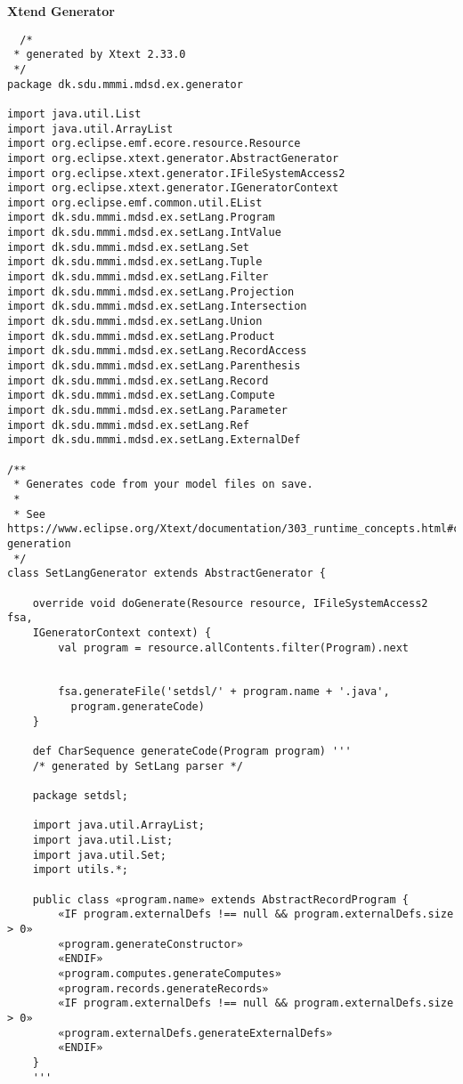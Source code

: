 \documentclass[12pt]{article}
\begin{document}
\textbf{Xtend Generator}

\begin{verbatim}
  /*
 * generated by Xtext 2.33.0
 */
package dk.sdu.mmmi.mdsd.ex.generator

import java.util.List
import java.util.ArrayList
import org.eclipse.emf.ecore.resource.Resource
import org.eclipse.xtext.generator.AbstractGenerator
import org.eclipse.xtext.generator.IFileSystemAccess2
import org.eclipse.xtext.generator.IGeneratorContext
import org.eclipse.emf.common.util.EList
import dk.sdu.mmmi.mdsd.ex.setLang.Program
import dk.sdu.mmmi.mdsd.ex.setLang.IntValue
import dk.sdu.mmmi.mdsd.ex.setLang.Set
import dk.sdu.mmmi.mdsd.ex.setLang.Tuple
import dk.sdu.mmmi.mdsd.ex.setLang.Filter
import dk.sdu.mmmi.mdsd.ex.setLang.Projection
import dk.sdu.mmmi.mdsd.ex.setLang.Intersection
import dk.sdu.mmmi.mdsd.ex.setLang.Union
import dk.sdu.mmmi.mdsd.ex.setLang.Product
import dk.sdu.mmmi.mdsd.ex.setLang.RecordAccess
import dk.sdu.mmmi.mdsd.ex.setLang.Parenthesis
import dk.sdu.mmmi.mdsd.ex.setLang.Record
import dk.sdu.mmmi.mdsd.ex.setLang.Compute
import dk.sdu.mmmi.mdsd.ex.setLang.Parameter
import dk.sdu.mmmi.mdsd.ex.setLang.Ref
import dk.sdu.mmmi.mdsd.ex.setLang.ExternalDef

/**
 * Generates code from your model files on save.
 * 
 * See https://www.eclipse.org/Xtext/documentation/303_runtime_concepts.html#code-generation
 */
class SetLangGenerator extends AbstractGenerator {

	override void doGenerate(Resource resource, IFileSystemAccess2 fsa, 
    IGeneratorContext context) {
		val program = resource.allContents.filter(Program).next
		
		
		fsa.generateFile('setdsl/' + program.name + '.java', 
          program.generateCode)
	}
	
	def CharSequence generateCode(Program program) '''
	/* generated by SetLang parser */
	
	package setdsl;
	
	import java.util.ArrayList;
	import java.util.List;
	import java.util.Set;
	import utils.*;
	
	public class «program.name» extends AbstractRecordProgram {
		«IF program.externalDefs !== null && program.externalDefs.size > 0»
		«program.generateConstructor»
		«ENDIF»
		«program.computes.generateComputes»
		«program.records.generateRecords»
		«IF program.externalDefs !== null && program.externalDefs.size > 0»
		«program.externalDefs.generateExternalDefs»
		«ENDIF»
	}
	'''
	

\end{verbatim}
\end{document}
